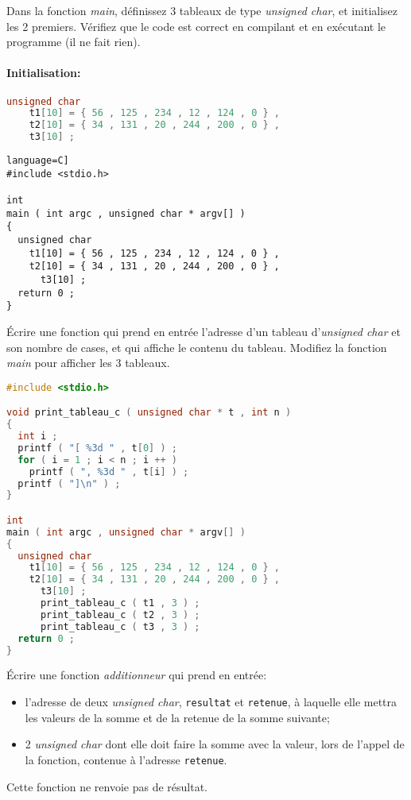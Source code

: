 \question Dans la fonction \emph{main}, définissez 3 tableaux de type
\emph{unsigned char}, et initialisez les 2 premiers. Vérifiez que le
code est correct en compilant et en exécutant le programme (il ne fait
rien).
\paragraph{Initialisation:} 
\begin{lstlisting}[language=C]
unsigned char
    t1[10] = { 56 , 125 , 234 , 12 , 124 , 0 } ,
    t2[10] = { 34 , 131 , 20 , 244 , 200 , 0 } ,
    t3[10] ;
\end{lstlisting}
\begin{solutioncachee}
  \begin{lstlisting}language=C]
#include <stdio.h>

int
main ( int argc , unsigned char * argv[] )
{
  unsigned char
    t1[10] = { 56 , 125 , 234 , 12 , 124 , 0 } ,
    t2[10] = { 34 , 131 , 20 , 244 , 200 , 0 } ,
      t3[10] ;
  return 0 ;
}
  \end{lstlisting}
\end{solutioncachee}

\question Écrire une fonction qui prend en entrée l'adresse d'un tableau d'\emph{unsigned char} et son nombre de cases, et qui affiche le contenu du tableau. Modifiez la fonction 
\emph{main} pour afficher les 3 tableaux.
\begin{solutioncachee}
  \begin{lstlisting}[language=C]
#include <stdio.h>

void print_tableau_c ( unsigned char * t , int n )
{
  int i ;
  printf ( "[ %3d " , t[0] ) ;
  for ( i = 1 ; i < n ; i ++ )
    printf ( ", %3d " , t[i] ) ;
  printf ( "]\n" ) ;
}

int
main ( int argc , unsigned char * argv[] )
{
  unsigned char
    t1[10] = { 56 , 125 , 234 , 12 , 124 , 0 } ,
    t2[10] = { 34 , 131 , 20 , 244 , 200 , 0 } ,
      t3[10] ;
      print_tableau_c ( t1 , 3 ) ;
      print_tableau_c ( t2 , 3 ) ;
      print_tableau_c ( t3 , 3 ) ;
  return 0 ;
}    
  \end{lstlisting}
\end{solutioncachee}

\question Écrire une fonction \emph{additionneur} qui prend en entrée:
\begin{itemize}
\item l'adresse de deux \emph{unsigned char}, \texttt{resultat} et
  \texttt{retenue}, à laquelle elle mettra les valeurs de la somme et
  de la retenue de la somme suivante;
\item 2 \emph{unsigned char} dont elle doit faire la somme avec la valeur, lors
  de l'appel de la fonction, contenue à l'adresse \texttt{retenue}.
\end{itemize}
Cette fonction ne renvoie pas de résultat.

